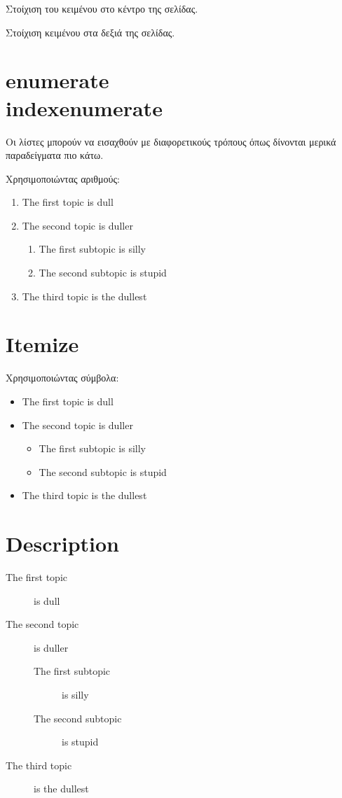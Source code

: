 \begin{center}
Στοίχιση του κειμένου στο κέντρο της σελίδας.
\end{center}

\begin{flushright}
Στοίχιση κειμένου στα δεξιά της σελίδας.
\end{flushright}


\section*{enumerate\\index{enumerate}}
Οι λίστες μπορούν να εισαχθούν με διαφορετικούς τρόπους όπως δίνονται μερικά παραδείγματα πιο κάτω.

Χρησιμοποιώντας αριθμούς:
\begin{enumerate}
\item The first topic is dull
\item The second topic is duller
\begin{enumerate}
\item The first subtopic is silly
\item The second subtopic is stupid
\end{enumerate}
\item The third topic is the dullest
\end{enumerate}


\section*{Itemize}
Χρησιμοποιώντας σύμβολα:
\begin{itemize}
\item The first topic is dull
\item The second topic is duller
\begin{itemize}
\item The first subtopic is silly
\item The second subtopic is stupid
\end{itemize}
\item The third topic is the dullest
\end{itemize}

\section*{Description}
\begin{description}
\item[The first topic] is dull
\item[The second topic] is duller
\begin{description}
\item[The first subtopic] is silly
\item[The second subtopic] is stupid
\end{description}
\item[The third topic] is the dullest
\end{description}

